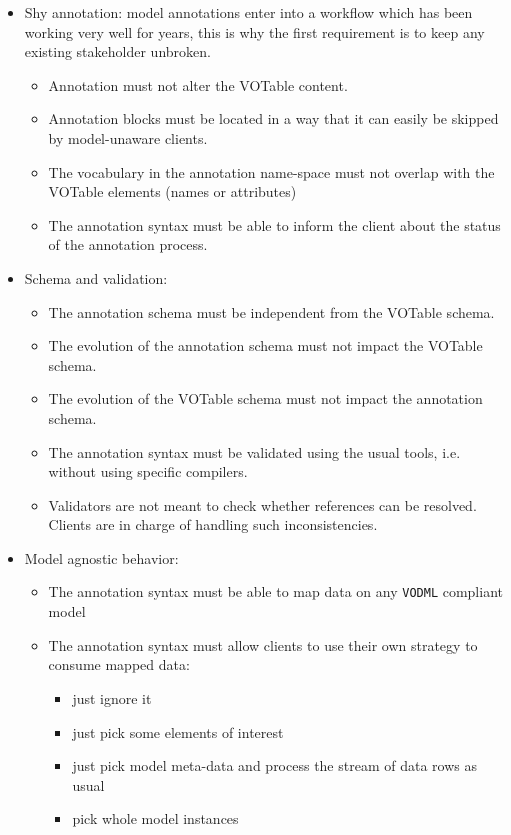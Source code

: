 \begin {itemize}
  \item Shy annotation: model annotations enter into a workflow which has been working very well for years, this is why the first requirement is to keep any existing stakeholder unbroken.
  \begin {itemize}
    \item Annotation must not alter the VOTable content.
    \item Annotation blocks must be located in a way that it can easily be skipped by model-unaware clients.
    \item The vocabulary in the annotation name-space must not overlap with the VOTable elements (names or attributes)    
    \item The annotation syntax must be able to inform the client about the status of the annotation process.
  \end {itemize}
  
  \item Schema and validation:
  \begin {itemize}
    \item The annotation schema must be independent from the VOTable schema.
    \item The evolution of the annotation schema must not impact the VOTable schema.
    \item The evolution of the VOTable schema must not impact the annotation schema.
    \item The annotation syntax must be validated using the usual tools, i.e. without using specific compilers.
    \item Validators are not meant to check whether references can be resolved. Clients are in charge of handling such inconsistencies.
  \end {itemize}
  
  \item Model agnostic behavior:
  \begin {itemize}
    \item The annotation syntax must be able to map data on any \texttt{VODML} compliant model
    \item The annotation syntax must allow clients to use their own strategy to consume mapped data:
      \begin {itemize}
        \item just ignore it
        \item just pick some elements of interest 
        \item just pick model meta-data and process the stream of data rows as usual
        \item pick whole model instances
      \end {itemize}
  \end {itemize}
  

\end{itemize}
